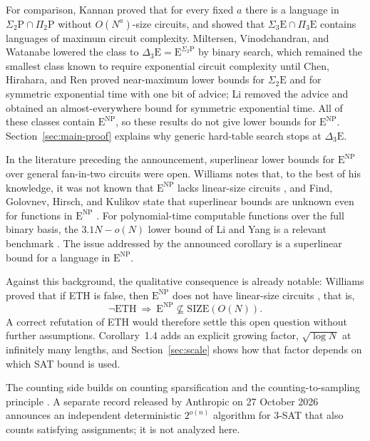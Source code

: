 \documentclass[11pt,reqno]{amsart}
\numberwithin{equation}{section}
\theoremstyle{plain}
\theoremstyle{definition}
\theoremstyle{remark}
\newcommand{\ENP}{\mathrm E^{\mathrm{NP}}}
\begin{document}
For comparison, Kannan \cite{Kannan} proved that for every fixed $a$ there
is a language in $\Sigma_2\mathrm P\cap\Pi_2\mathrm P$ without
$O(N^a)$-size circuits, and showed that $\Sigma_3\mathrm E\cap\Pi_3\mathrm E$
contains languages of maximum circuit complexity. Miltersen, Vinodchandran,
and Watanabe \cite{MVW} lowered the class to
$\Delta_3\mathrm E=\mathrm E^{\Sigma_2\mathrm P}$ by binary search, which
remained the smallest class known to require exponential circuit
complexity until Chen, Hirahara, and Ren \cite{CHR} proved near-maximum
lower bounds for $\Sigma_2\mathrm E$ and for symmetric exponential time
with one bit of advice; Li \cite{LiZ} removed the advice and obtained an
almost-everywhere bound for symmetric exponential time. All of these
classes contain $\ENP$, so these results do not give lower bounds for
$\ENP$. Section~\ref{sec:main-proof} explains why generic hard-table search
stops at $\Delta_3\mathrm E$.

In the literature preceding the announcement, superlinear lower bounds for
$\ENP$ over general fan-in-two circuits were open. Williams notes that, to
the best of his knowledge, it was not known that $\ENP$ lacks linear-size
circuits \cite[Section~1.1.1, footnote~5]{Williams}, and Find, Golovnev,
Hirsch, and Kulikov state that superlinear bounds are unknown even for
functions in $\ENP$ \cite[Section~1.1]{FGHK}. For polynomial-time computable
functions over the full binary basis, the $3.1N-o(N)$ lower bound of Li and
Yang is a relevant benchmark \cite{LiYang}. The issue addressed by the
announced corollary is a superlinear bound for a language in $\ENP$.

Against this background, the qualitative consequence is already notable:
Williams proved that if ETH is false, then $\ENP$ does not have
linear-size circuits \cite[Theorem~6.1]{Williams}, that is,
\[
 \neg\mathrm{ETH}\ \Longrightarrow\ \ENP\not\subseteq\mathrm{SIZE}(O(N)).
\]
A correct refutation of ETH would therefore settle this open question
without further assumptions. Corollary~1.4 adds an explicit growing factor,
$\sqrt{\log N}$ at infinitely many lengths, and Section~\ref{sec:scale}
shows how that factor depends on which SAT bound is used.

The counting side builds on counting sparsification \cite{DHM} and the
counting-to-sampling principle \cite{JVV}. A separate record released by
Anthropic on 27 October 2026 \cite{Anthropic} announces an independent
deterministic $2^{o(n)}$ algorithm for 3-SAT that also counts satisfying
assignments; it is not analyzed here.
\end{document}
